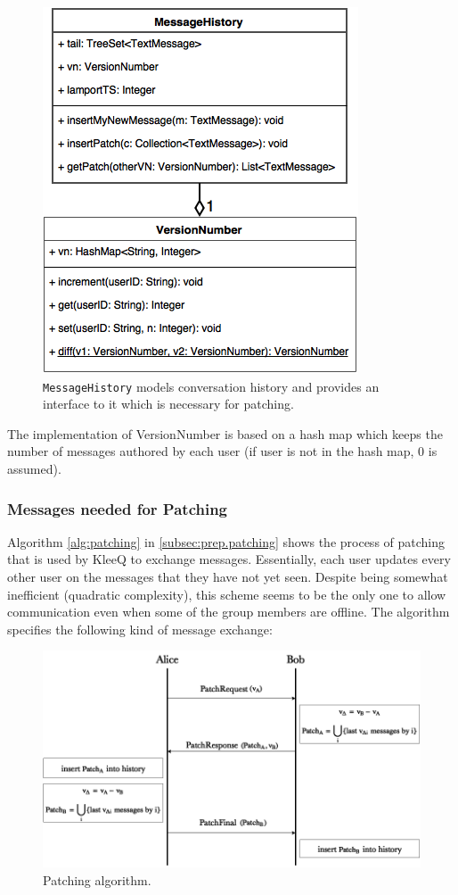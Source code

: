 \documentclass[a4paper, twoside, 12pt]{report}
\begin{document}
\begin{figure}[H]
    \captionsetup{width=0.76\textwidth}
    \centering
    \includegraphics[width=0.4\linewidth]{pics/history_uml.png}
    \caption{\label{fig:history_uml} \texttt{MessageHistory} models conversation history and provides an interface to it which is necessary for patching.}
\end{figure}
The implementation of VersionNumber is based on a hash map which keeps the number of messages authored by each user (if user is not in the hash map, 0 is assumed).



\subsubsection{Messages needed for Patching}
Algorithm \ref{alg:patching} in \cref{subsec:prep.patching} shows the process of patching that is used by KleeQ to exchange messages. Essentially, each user updates every other user on the messages that they have not yet seen. Despite being somewhat inefficient (quadratic complexity), this scheme seems to be the only one to allow communication even when some of the group members are offline. The algorithm specifies the following kind of message exchange:

\begin{figure}[H]
    \captionsetup{width=0.76\textwidth}
    \centering
    \includegraphics[width=0.8\linewidth]{pics/patching_orig.png}
    \caption{\label{fig:patching_orig} Patching algorithm.}
\end{figure}
\end{document}

